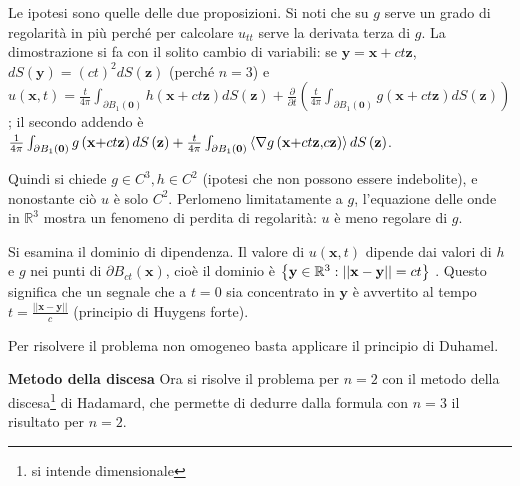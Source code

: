 \documentclass{article}
\begin{document}
Le ipotesi sono quelle delle due proposizioni. Si noti che su $g$ serve un
grado di regolarit\`{a} in pi\`{u} perch\'{e} per calcolare $u_{tt}$ serve
la derivata terza di $g$. La dimostrazione si fa con il solito cambio di
variabili: se $\mathbf{y=x}+ct\mathbf{z}$, $dS\left( \mathbf{y}\right)
=\left( ct\right) ^{2}dS\left( \mathbf{z}\right) $ (perch\'{e} $n=3$) e $%
u\left( \mathbf{x},t\right) =\frac{t}{4\pi }\int_{\partial B_{1}\left( 
\mathbf{0}\right) }h\left( \mathbf{x+}ct\mathbf{z}\right) dS\left( \mathbf{z}%
\right) +\frac{\partial }{\partial t}\left( \frac{t}{4\pi }\int_{\partial
B_{1}\left( \mathbf{0}\right) }g\left( \mathbf{x+}ct\mathbf{z}\right)
dS\left( \mathbf{z}\right) \right) $; il secondo addendo \`{e} $\frac{1}{%
4\pi }\int_{\partial B_{1}\left( \mathbf{0}\right) }g\left( \mathbf{x+}ct%
\mathbf{z}\right) dS\left( \mathbf{z}\right) +\frac{t}{4\pi }\int_{\partial
B_{1}\left( \mathbf{0}\right) }\left\langle \nabla g\left( \mathbf{x+}ct%
\mathbf{z,}c\mathbf{z}\right) \right\rangle dS\left( \mathbf{z}\right) $.

Quindi si chiede $g\in C^{3},h\in C^{2}$ (ipotesi che non possono essere
indebolite), e nonostante ci\`{o} $u$ \`{e} solo $C^{2}$. Perlomeno
limitatamente a $g$, l'equazione delle onde in $%
\mathbb{R}
^{3}$ mostra un fenomeno di perdita di regolarit\`{a}: $u$ \`{e} meno
regolare di $g$.

Si esamina il dominio di dipendenza. Il valore di $u\left( \mathbf{x}%
,t\right) $ dipende dai valori di $h$ e $g$ nei punti di $\partial
B_{ct}\left( \mathbf{x}\right) $, cio\`{e} il dominio \`{e} $\left\{ \mathbf{%
y}\in 
\mathbb{R}
^{3}:\left\vert \left\vert \mathbf{x-y}\right\vert \right\vert =ct\right\} $%
. Questo significa che un segnale che a $t=0$ sia concentrato in $\mathbf{y}$
\`{e} avvertito al tempo $t=\frac{\left\vert \left\vert \mathbf{x-y}%
\right\vert \right\vert }{c}$ (principio di Huygens forte).

Per risolvere il problema non omogeneo basta applicare il principio di
Duhamel.

\textbf{Metodo della discesa} Ora si risolve il problema per $n=2$ con il
metodo della discesa\footnote{%
si intende dimensionale} di Hadamard, che permette di dedurre dalla formula
con $n=3$ il risultato per $n=2$.
\end{document}
